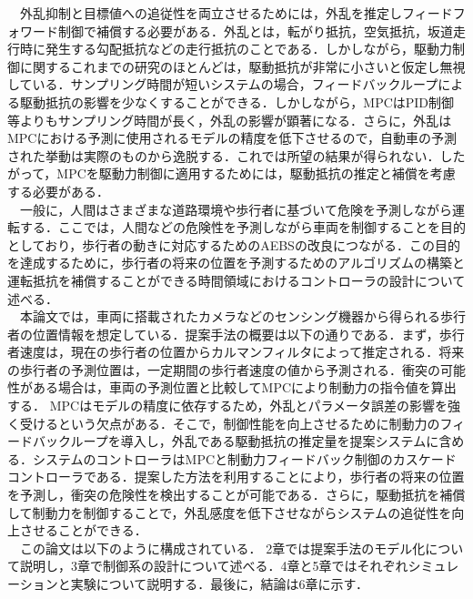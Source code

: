 　外乱抑制と目標値への追従性を両立させるためには，外乱を推定しフィードフォワード制御で補償する必要がある．外乱とは，転がり抵抗，空気抵抗，坂道走行時に発生する勾配抵抗などの走行抵抗のことである．しかしながら，駆動力制御に関するこれまでの研究のほとんどは，駆動抵抗が非常に小さいと仮定し無視している．サンプリング時間が短いシステムの場合，フィードバックループによる駆動抵抗の影響を少なくすることができる．しかしながら，MPCはPID制御等よりもサンプリング時間が長く，外乱の影響が顕著になる．さらに，外乱はMPCにおける予測に使用されるモデルの精度を低下させるので，自動車の予測された挙動は実際のものから逸脱する．これでは所望の結果が得られない．したがって，MPCを駆動力制御に適用するためには，駆動抵抗の推定と補償を考慮する必要がある．\\
　一般に，人間はさまざまな道路環境や歩行者に基づいて危険を予測しながら運転する．ここでは，人間などの危険性を予測しながら車両を制御することを目的としており，歩行者の動きに対応するためのAEBSの改良につながる．この目的を達成するために，歩行者の将来の位置を予測するためのアルゴリズムの構築と運転抵抗を補償することができる時間領域におけるコントローラの設計について述べる．\\
　本論文では，車両に搭載されたカメラなどのセンシング機器から得られる歩行者の位置情報を想定している．提案手法の概要は以下の通りである．まず，歩行者速度は，現在の歩行者の位置からカルマンフィルタによって推定される．将来の歩行者の予測位置は，一定期間の歩行者速度の値から予測される．衝突の可能性がある場合は，車両の予測位置と比較してMPCにより制動力の指令値を算出する． MPCはモデルの精度に依存するため，外乱とパラメータ誤差の影響を強く受けるという欠点がある．そこで，制御性能を向上させるために制動力のフィードバックループを導入し，外乱である駆動抵抗の推定量を提案システムに含める．システムのコントローラはMPCと制動力フィードバック制御のカスケードコントローラである．提案した方法を利用することにより，歩行者の将来の位置を予測し，衝突の危険性を検出することが可能である．さらに，駆動抵抗を補償して制動力を制御することで，外乱感度を低下させながらシステムの追従性を向上させることができる．\\
　この論文は以下のように構成されている． 2章では提案手法のモデル化について説明し，3章で制御系の設計について述べる．4章と5章ではそれぞれシミュレーションと実験について説明する．最後に，結論は6章に示す．\\